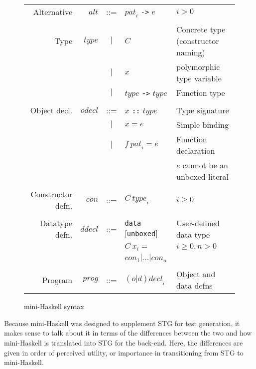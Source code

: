 \documentclass{llncs}
\begin{document}
\begin{figure}[h!tb]
\begin{tabular}{r r c l l}
\\
Alternative        & $\mathit{alt}$      & ::= & $\mathit{pat}_i$ \texttt{->} $e$ & $i > 0$ \\
\\
Type               & $\mathit{type}$     & $|$ & $C$ & Concrete type (constructor naming) \\
                   &                     & $|$ & $x$ & polymorphic type variable \\
                   &                     & $|$ & $\mathit{type}$ \texttt{->} $\mathit{type}$ & Function type \\
\\
Object decl. & $\mathit{odecl}$    & ::= & $x$ \texttt{::} $\mathit{type}$ & Type signature \\
                   &                     & $|$ & $x = e$ & Simple binding \\
                   &                     & $|$ & $f\ \mathit{pat}_i = e$ & Function declaration \\
                   &                     &     & & $e$ cannot be an unboxed literal \\
\\
Constructor defn. & $\mathit{con}$  & ::= & $C\ \mathit{type}_i$ & $i \ge 0$ \\
\\
Datatype defn. &  $\mathit{ddecl}$ & ::= & \texttt{data} [\texttt{unboxed}] & User-defined data type  \\
               &                   &     & $C\ x_i =$                       & $i \ge 0, n > 0$         \\
               &                   &     & $\mathit{con}_1 | \dots |  \mathit{con}_n$ \\

\\
Program                & $\mathit{prog}$ & ::= & $\mathit{(o|d)decl}_i$ & Object and data defns
\end{tabular}
\caption{mini-Haskell syntax}
\label{fig:miniHaskell}
\end{figure}


Because mini-Haskell was designed to supplement STG for test generation, it
makes sense to talk about it in terms of the differences between the two and
how mini-Haskell is translated into STG for the back-end.  Here, the
differences are given in order of perceived utility, or importance in
transitioning from STG to mini-Haskell.

\vspace{-0.1in}
\end{document}
